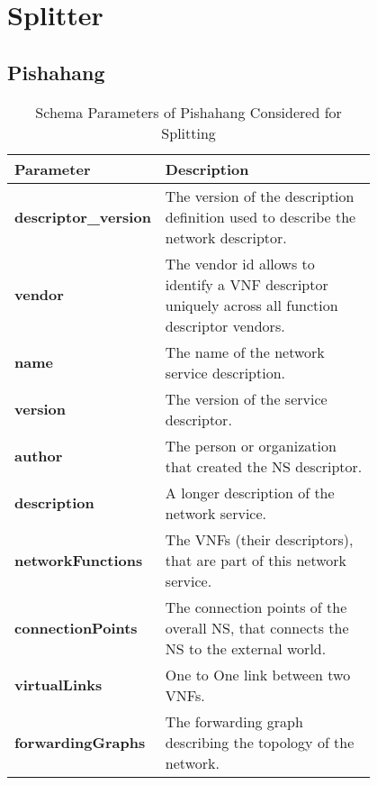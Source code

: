 \newpage
\section{Splitter}
\subsection{Pishahang}
\begin{table}[htbp] \cite{SONATASchemaDocumentation}
	\begin{center}
		\caption{Schema Parameters of Pishahang Considered for Splitting}
		\label{tab:table1}
		\begin{tabular}{|l|p{0.8\linewidth}|}
			\textbf{Parameter} & \textbf{Description}\\
			
			\hline
			\textbf{descriptor\_version} & The version of the description definition used to describe the network descriptor. \\ 
			\textbf{vendor } & The vendor id allows to identify a VNF descriptor uniquely across all function descriptor vendors.  \\
			\textbf{name} & The name of the network service description. \\
			\textbf{version} & The version of the service descriptor. \\
			\textbf{author} & The person or organization that created the NS descriptor. \\
			\textbf{description} & A longer description of the network service. \\
			\textbf{networkFunctions} & The VNFs (their descriptors), that are part of this network service. \\
			\textbf{connectionPoints} & The connection points of the overall NS, that connects the NS to the external world. \\
			\textbf{virtualLinks} & One to One link between two VNFs. \\
			\textbf{forwardingGraphs} & The forwarding graph describing the topology of the network. \\
		\end{tabular}
	\end{center}
\end{table}
\pagebreak

